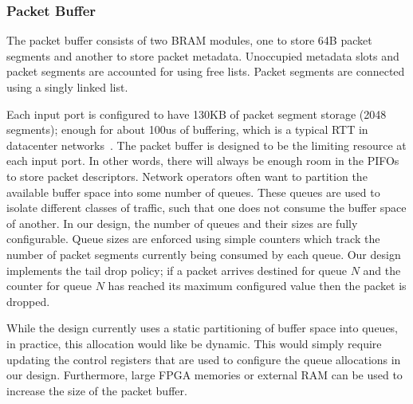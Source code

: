 \subsubsection{Packet Buffer}

The packet buffer consists of two BRAM modules, one to store 64B packet segments and another to store packet metadata. Unoccupied metadata slots and packet segments are accounted for using free lists. Packet segments are connected using a singly linked list.

Each input port is configured to have 130KB of packet segment storage (2048 segments); enough for about 100us of buffering, which is a typical RTT in datacenter networks~\cite{timely}. The packet buffer is designed to be the limiting resource at each input port. In other words, there will always be enough room in the PIFOs to store packet descriptors. Network operators often want to partition the available buffer space into some number of queues. These queues are used to isolate different classes of traffic, such that one does not consume the buffer space of another. In our design, the number of queues and their sizes are fully configurable. Queue sizes are enforced using simple counters which track the number of packet segments currently being consumed by each queue. Our design implements the tail drop policy; if a packet arrives destined for queue $N$ and the counter for queue $N$ has reached its maximum configured value then the packet is dropped.

While the design currently uses a static partitioning of buffer space into queues, in practice, this allocation would like be dynamic. This would simply require updating the control registers that are used to configure the queue allocations in our design. Furthermore, large FPGA memories or external RAM can be used to increase the size of the packet buffer.

